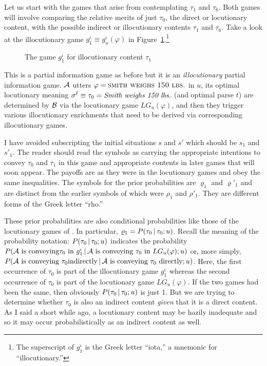 Let us start with the games that arise from contemplating $\tau_1$ and $\tau_6$. Both games will involve comparing the relative merits of just $\tau_0$, the direct or locutionary content, with the possible indirect or illocutionary contents $\tau_1$ and $\tau_6$. Take a look at the illocutionary game $g^\iota_1 \equiv g^\iota_u(\varphi)$ in Figure~\ref{fig:ic1 game}.\footnote{The superscript of $g^\iota_1$ is the Greek letter ``iota,'' a mnemonic for ``illocutionary.''}

\begin{figure}[htbp] 
 
\caption{The game $g^\iota_1$ for illocutionary content $\tau_1$}
\label{fig:ic1 game}
\end{figure}

This is a partial information game as before but it is an \emph{illocutionary}  partial information game. $\cal A$ utters $\varphi = \Expression{Smith weighs 150 lbs.}$ in $u$, its optimal locutionary meaning $\sigma^\ell \equiv \tau_0 = \emph{Smith weighs 150 lbs.}$ (and optimal parse $t$) are determined by $\cal B$ via the locutionary game $LG_u(\varphi)$, and then they trigger various illocutionary enrichments that need to be derived via corresponding illocutionary games.

I have avoided subscripting the initial situations $s$ and $s'$ which should be $s_1$ and $s'_1$. The reader should read the symbols as carrying the appropriate intentions to convey $\tau_0$ and $\tau_1$ in this game and appropriate contents in later games that will soon appear. The payoffs are as they were in the locutionary games and obey the same inequalities. The symbols for the prior probabilities are $\varrho_1$ and $\varrho'_1$ and are distinct from the earlier symbols of  which were $\rho_1$ and $\rho'_1$. They are different forms of the Greek letter ``rho.''

These prior probabilities are also conditional probabilities like those of the locutionary games of . In particular, $\varrho_1 = P(\tau_0 \,|\, \tau_0; u)$. Recall the meaning of the probability notation: $P(\tau_0 \,|\, \tau_0; u)$ indicates the probability $P({\cal A}\ \text{is conveying}\allowbreak \tau_0\ \hbox{in}\ g^\iota_1 \cond {\cal A}\ \text{is conveying}\ \tau_0\ \hbox{in}\ LG_u(\varphi); u)$  or, more simply, $P({\cal A} \text{ is conveying } \tau_0\linebreak \text{indirectly} \cond {\cal A} \text{ is conveying } \tau_0 \text{ directly}; u)$. Here, the first occurrence of $\tau_0$ is part of the illocutionary game $g^\iota_1$ whereas the second occurrence of $\tau_0$ is part of the locutionary game $LG_u(\varphi)$. If the two games had been the same, then obviously $P(\tau_0 \,|\, \tau_0; u)$ is just 1. But we are trying to determine whether $\tau_0$ is also an indirect content \emph{given} that it is a direct content. As I said a short while ago, a locutionary content may be hazily inadequate and so it may occur probabilistically as an indirect content as well.


